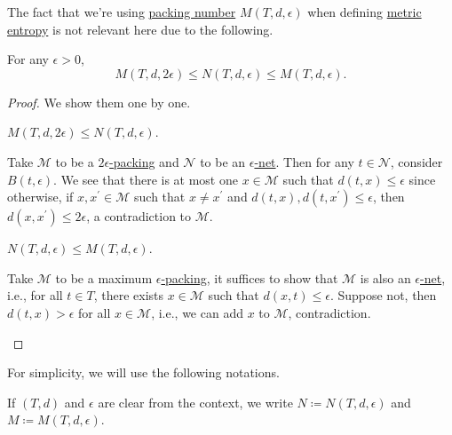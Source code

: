 The fact that we're using \hyperref[def:packing-number]{packing number} \(M(T, d, \epsilon )\) when defining \hyperref[def:metric-entropy]{metric entropy} is not relevant here due to the following.

\begin{lemma}\label{lma:covering-packing}
	For any \(\epsilon > 0\),
	\[
		M(T, d, 2\epsilon ) \leq N(T, d, \epsilon ) \leq M(T, d, \epsilon ).
	\]
\end{lemma}
\begin{proof}
	We show them one by one.

	\begin{claim}
		\(M(T, d, 2\epsilon ) \leq N(T, d, \epsilon )\).
	\end{claim}
	\begin{explanation}
		Take \(\mathcal{M} \) to be a \hyperref[def:eps-packing]{\(2\epsilon\)-packing} and \(\mathcal{N} \) to be an \hyperref[def:eps-net]{\(\epsilon\)-net}. Then for any \(t\in \mathcal{N} \), consider \(B(t, \epsilon )\). We see that there is at most one \(x\in \mathcal{M} \) such that \(d(t, x) \leq \epsilon \) since otherwise, if \(x, x^{\prime} \in \mathcal{M} \) such that \(x \neq x^{\prime} \) and \(d(t, x), d(t, x^{\prime} ) \leq \epsilon \), then \(d(x, x^{\prime} ) \leq 2\epsilon \), a contradiction to \(\mathcal{M} \).
	\end{explanation}

	\begin{claim}
		\(N(T, d, \epsilon ) \leq M(T, d, \epsilon )\).
	\end{claim}
	\begin{explanation}
		Take \(\mathcal{M} \) to be a maximum \hyperref[def:eps-packing]{\(\epsilon\)-packing}, it suffices to show that \(\mathcal{M} \) is also an \hyperref[def:eps-net]{\(\epsilon\)-net}, i.e., for all \(t\in T\), there exists \(x\in \mathcal{M} \) such that \(d(x, t) \leq \epsilon \). Suppose not, then \(d(t, x) > \epsilon \) for all \(x\in \mathcal{M} \), i.e., we can add \(x\) to \(\mathcal{M} \), contradiction.
	\end{explanation}
\end{proof}

For simplicity, we will use the following notations.

\begin{notation}
	If \((T, d)\) and \(\epsilon \) are clear from the context, we write \(N \coloneqq N(T, d, \epsilon )\) and \(M \coloneqq M(T, d, \epsilon )\).
\end{notation}

